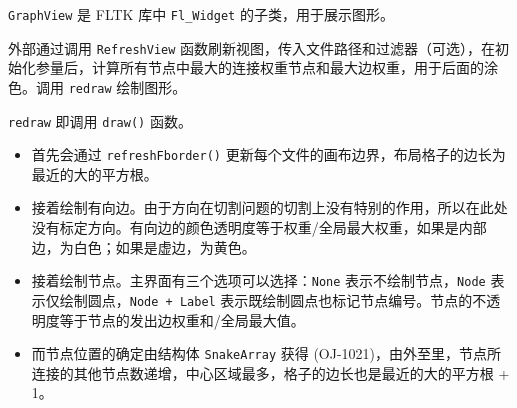 \documentclass[a4paper,12pt]{article}
\begin{document}
\begin{CJK}{UTF8}{song}
\texttt{GraphView} 是 FLTK 库中 \texttt{Fl\_Widget}
的子类，用于展示图形。

外部通过调用 \texttt{RefreshView}
函数刷新视图，传入文件路径和过滤器（可选），在初始化参量后，计算所有节点中最大的连接权重节点和最大边权重，用于后面的涂色。调用
\texttt{redraw} 绘制图形。

\texttt{redraw} 即调用 \texttt{draw()} 函数。

\begin{itemize}
\item
  首先会通过 \texttt{refreshFborder()}
  更新每个文件的画布边界，布局格子的边长为最近的大的平方根。
\item
  接着绘制有向边。由于方向在切割问题的切割上没有特别的作用，所以在此处没有标定方向。有向边的颜色透明度等于权重/全局最大权重，如果是内部边，为白色；如果是虚边，为黄色。
\item
  接着绘制节点。主界面有三个选项可以选择：\texttt{None}
  表示不绘制节点，\texttt{Node} 表示仅绘制圆点，\texttt{Node\ +\ Label}
  表示既绘制圆点也标记节点编号。节点的不透明度等于节点的发出边权重和/全局最大值。
\item
  而节点位置的确定由结构体 \texttt{SnakeArray} 获得
  (OJ-1021)，由外至里，节点所连接的其他节点数递增，中心区域最多，格子的边长也是最近的大的平方根
  + 1。
\end{itemize}



\end{CJK}
\end{document}
